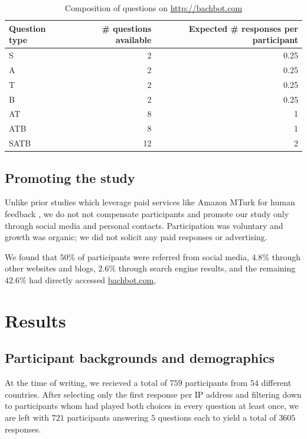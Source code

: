 \begin{table}[tb]
  \centering
  \begin{tabular}{lrr}
    \toprule
    Question type & \# questions available & Expected \# responses per participant \\
    \midrule
    S        & 2  & 0.25 \\
    A        & 2  & 0.25 \\
    T        & 2  & 0.25 \\
    B        & 2  & 0.25 \\
    AT       & 8  & 1 \\
    ATB      & 8  & 1 \\
    SATB     & 12 & 2 \\
    \bottomrule
  \end{tabular}
  \caption{Composition of questions on \url{http://bachbot.com}}
  \label{tab:bachbot-com-question-distribtion}
\end{table}

\subsection{Promoting the study}

Unlike prior studies which leverage paid services like Amazon MTurk for human
feedback \cite{quick2014kulitta}, we do not not compensate participants and
promote our study only through social media and personal contacts.
Participation was voluntary and growth was organic; we did not solicit any paid
responses or advertising.

We found that $50\%$ of participants were referred from social media, $4.8\%$
through other websites and blogs, $2.6\%$ through search engine results, and
the remaining $42.6\%$ had directly accessed \url{bachbot.com},

\section{Results}\label{sec:eval-results}

\subsection{Participant backgrounds and demographics}

At the time of writing, we recieved a total of $759$ participants from $54$
different countries. After selecting only the first response per IP address and
filtering down to participants whom had played both choices in every question
at least once, we are left with $721$ participants answering $5$ questions each
to yield a total of $3605$ responses.

